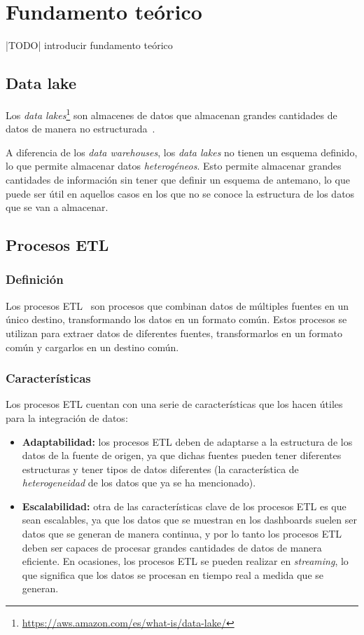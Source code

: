 \chapter{Fundamento teórico}\label{chap:teoria}
|TODO| introducir fundamento teórico

\section{Data lake}\label{sec:datalake}
Los \textit{data lakes}\footnote{\url{https://aws.amazon.com/es/what-is/data-lake/}}
son almacenes de datos que almacenan grandes cantidades de datos de manera no
estructurada~\cite{mier2023dashboards}.

A diferencia de los \textit{data warehouses}, los \textit{data lakes} no tienen un
esquema definido, lo que permite almacenar datos \textit{heterogéneos}. Esto permite
almacenar grandes cantidades de información sin tener que definir un esquema de antemano,
lo que puede ser útil en aquellos casos en los que no se conoce la estructura de los
datos que se van a almacenar.

\section{Procesos ETL}\label{sec:etl}
\subsection{Definición}
Los procesos ETL~\cite{mier2023dashboards} son procesos que combinan datos de múltiples
fuentes en un único destino, transformando los datos en un formato común. Estos procesos
se utilizan para extraer datos de diferentes fuentes, transformarlos en un formato común
y cargarlos en un destino común.

\subsection{Características}
Los procesos ETL cuentan con una serie de características que los hacen útiles para la
integración de datos:

\begin{itemize}
	\item \textbf{Adaptabilidad:} los procesos ETL deben de adaptarse a la estructura de los
		datos de la fuente de origen, ya que dichas fuentes pueden tener diferentes estructuras
		y tener tipos de datos diferentes (la característica de \textit{heterogeneidad} de los
		datos que ya se ha mencionado).
	\item \textbf{Escalabilidad:} otra de las características clave de los procesos ETL es que sean
		escalables, ya que los datos que se muestran en los dashboards suelen ser datos que se generan
		de manera continua, y por lo tanto los procesos ETL deben ser capaces de procesar grandes cantidades
		de datos de manera eficiente. En ocasiones, los procesos ETL se pueden realizar en \textit{streaming},
		lo que significa que los datos se procesan en tiempo real a medida que se generan.
\end{itemize}


